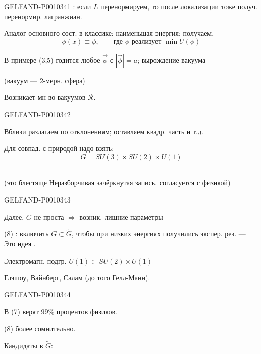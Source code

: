 \begin{GelfandAdjacentEvidence}{GELFAND-P001034}{1}
: если $L$ перенормируем, то после локализации тоже получ. перенормир. лагранжиан.

Аналог основного сост. в классике: наименьшая энергия; получаем,
\begin{equation*}
\phi(x)\equiv\phi,\qquad \text{где }\phi\text{ реализует }\min U(\phi)
\tag{6}
\end{equation*}

В примере (3,5) годится любое $\vec\phi$ с $|\vec\phi|=a$; вырождение вакуума

(вакуум --- 2-мерн. сфера)

Возникает мн-во вакуумов $\mathcal R$.

\end{GelfandAdjacentEvidence}
\begin{GelfandAdjacentEvidence}{GELFAND-P001034}{2}

Вблизи разлагаем по отклонениям; оставляем квадр. часть и т.д.

Для совпад. с природой надо взять:
\begin{equation*}
G=SU(3)\times SU(2)\times U(1)
\tag{7}
\end{equation*}
$+$ 

(это блестяще Неразборчивая зачёркнутая запись. согласуется с физикой)
\end{GelfandAdjacentEvidence}
\begin{GelfandAdjacentEvidence}{GELFAND-P001034}{3}


Далее, $G$ не проста $\Rightarrow$ возник. лишние параметры

(8) : включить $G\subset\widetilde G$, чтобы при низких энергиях получились экспер. рез.
--- Это идея .

Электромагн. подгр. $U(1)\subset SU(2)\times U(1)$

Глэшоу, Вайнберг, Салам (до того Гелл-Манн).
\end{GelfandAdjacentEvidence}
\begin{GelfandAdjacentEvidence}{GELFAND-P001034}{4}


В (7) верят $99\%$ процентов физиков.

(8) более сомнительно.

Кандидаты в $\widetilde G$:
\end{GelfandAdjacentEvidence}
